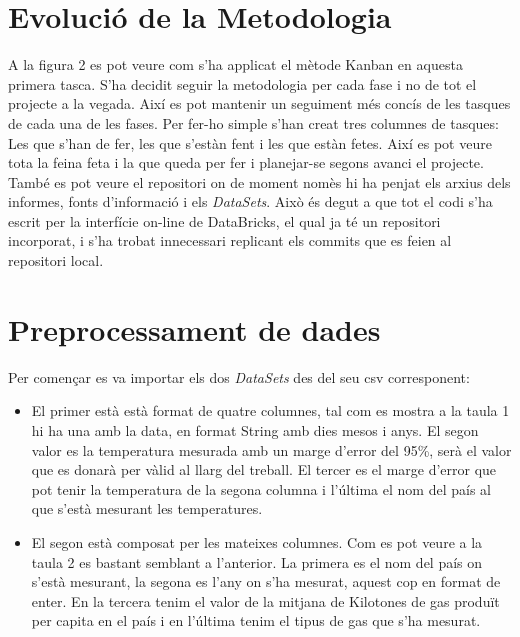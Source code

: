 \documentclass[10pt,a4paper,twocolumn,twoside]{article}
\begin{document}
\section{Evolució de la Metodologia}
A la figura 2 es pot veure com s'ha applicat el mètode Kanban en aquesta primera tasca. S'ha decidit seguir la metodologia per cada fase i no de tot el projecte a la vegada. Així es pot mantenir un seguiment més concís de les tasques de cada una de les fases. Per fer-ho simple s'han creat tres columnes de tasques: Les que s'han de fer, les que s'estàn fent i les que estàn fetes. Així es pot veure tota la feina feta i la que queda per fer i planejar-se segons avanci el projecte. També es pot veure el repositori on de moment nomès hi ha penjat els arxius dels informes, fonts d'informació i els \textit{DataSets}. Això és degut a que tot el codi s'ha escrit per la interfície on-line de DataBricks, el qual ja té un repositori incorporat, i s'ha trobat innecessari replicant els commits que es feien al repositori local.
\section{Preprocessament de dades}
Per començar es va importar els dos \textit{DataSets} des del seu csv corresponent:
\begin{itemize}
\item El primer està  està format de quatre columnes, tal com es mostra a la taula 1 hi ha una amb la data, en format String amb dies mesos i anys. El segon valor es la temperatura mesurada amb un marge d'error del 95\%, serà el valor que es donarà per vàlid al llarg del treball. El tercer es el marge d'error que pot tenir la temperatura de la segona columna i l'última el nom del país al que s'està mesurant les temperatures.
\item El segon està composat per les mateixes columnes. Com es pot veure a la taula 2 es bastant semblant a l'anterior. La primera es el nom del país on s'està mesurant, la segona es l'any on s'ha mesurat, aquest cop en format de enter. En la tercera tenim el valor de la mitjana de Kilotones de gas produït per capita en el país i en l'última tenim el tipus de gas que s'ha mesurat.
\end{itemize}
\end{document}
